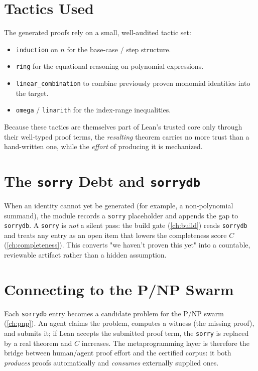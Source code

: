 \section{Tactics Used}
\label{sec:meta-tactics}

The generated proofs rely on a small, well-audited tactic set:
\begin{itemize}
  \item \texttt{induction} on $n$ for the base-case / step structure.
  \item \texttt{ring} for the equational reasoning on polynomial
        expressions.
  \item \texttt{linear\_combination} to combine previously proven
        monomial identities into the target.
  \item \texttt{omega} / \texttt{linarith} for the index-range
        inequalities.
\end{itemize}
Because these tactics are themselves part of Lean's trusted core only
through their well-typed proof terms, the \emph{resulting} theorem carries
no more trust than a hand-written one, while the \emph{effort} of producing
it is mechanized.

\section{The \texttt{sorry} Debt and \texttt{sorrydb}}
\label{sec:meta-sorry}

When an identity cannot yet be generated (for example, a non-polynomial
summand), the module records a \texttt{sorry} placeholder and appends the
gap to \texttt{sorrydb}. A \texttt{sorry} is \emph{not} a silent pass: the
build gate (\cref{ch:build}) reads \texttt{sorrydb} and treats any entry
as an open item that lowers the completeness score $C$
(\cref{ch:completeness}). This converts "we haven't proven this yet" into a
countable, reviewable artifact rather than a hidden assumption.

\section{Connecting to the P/NP Swarm}
\label{sec:meta-swarm}

Each \texttt{sorrydb} entry becomes a candidate problem for the P/NP swarm
(\cref{ch:pnp}). An agent claims the problem, computes a witness (the
missing proof), and submits it; if Lean accepts the submitted proof term,
the \texttt{sorry} is replaced by a real theorem and $C$ increases. The
metaprogramming layer is therefore the bridge between human/agent proof
effort and the certified corpus: it both \emph{produces} proofs
automatically and \emph{consumes} externally supplied ones.

